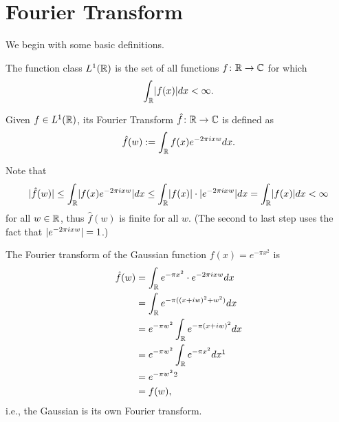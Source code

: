 \documentclass[11pt]{article}
\begin{document}
\thispagestyle{fancy}           %


\section{Fourier Transform}
\label{sec:ftrans}

We begin with some basic definitions.

\begin{definition}[$L^1$ function]
  \label{def:L1}
  The function class $L^1(\mathbb{R})$ is the set of all functions
  $f \colon \mathbb{R} \to \mathbb{C}$ for which
  \[ \int_{\mathbb{R}} \lvert f(x)\rvert dx < \infty . \]
\end{definition}

\begin{definition}
  \label{def:fourier-transform}
  Given $f \in L^1(\mathbb{R})$, its Fourier Transform
  $\hat{f} \colon \mathbb{R} \to \mathbb{C}$ is defined as
  \[\hat{f}(w) := \int_{\mathbb{R}} f(x) e^{-2\pi i x w} dx . \]
\end{definition}

\noindent
Note that
\[\lvert\hat{f}(w)\rvert \leq \int_{\mathbb{R}} \lvert f(x)e^{-2\pi ixw}\rvert dx
  \leq \int_{\mathbb{R}} \lvert f(x)\rvert \cdot \lvert e^{-2\pi i x w}\rvert dx = \int_{\mathbb{R}}
  \lvert f(x)\rvert dx < \infty\] for all $w \in \mathbb{R}$, thus $\hat{f}(w)$ is
finite for all $w$. (The second to last step uses the fact that
$\lvert e^{-2\pi ixw}\rvert = 1$.)

\begin{example}
  \label{ex:fourier-gaussian}
  The Fourier transform of the Gaussian function $f(x) = e^{-\pi x^2}$
  is
  \begin{align*}
    \hat{f}(w) 
    &= \int_{\R} e^{-\pi x^2} \cdot e^{-2\pi ixw} dx \\
    &= \int_{\R} e^{-\pi ((x + i w)^2 + w^2)} dx \\
    &= e^{-\pi w^2}\int_{\R} e^{-\pi (x + i w)^2} dx \\
    &= e^{-\pi w^2} \int_{\R} e^{-\pi x^2} dx
      {\footnotemark}\\
    &= e^{-\pi w^2} {\footnotemark} \\
    &= f(w),
  \end{align*}
  i.e., the Gaussian is its own Fourier transform.
\end{example}
 
\addtocounter{footnote}{-1} 
\end{document}
